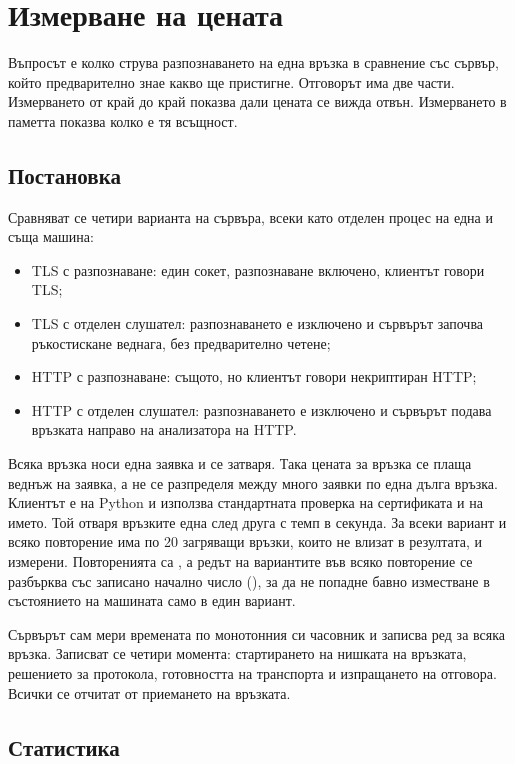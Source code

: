 \section{Измерване на цената}
\label{sec:measurement}

Въпросът е колко струва разпознаването на една връзка в сравнение със сървър, който
предварително знае какво ще пристигне. Отговорът има две части. Измерването от край до
край показва дали цената се вижда отвън. Измерването в паметта показва колко е тя
всъщност.

\subsection{Постановка}

Сравняват се четири варианта на сървъра, всеки като отделен процес на една и съща машина:
\begin{itemize}
\item TLS с разпознаване: един сокет, разпознаване включено, клиентът говори TLS;
\item TLS с отделен слушател: разпознаването е изключено и сървърът започва
  ръкостискане веднага, без предварително четене;
\item HTTP с разпознаване: същото, но клиентът говори некриптиран HTTP;
\item HTTP с отделен слушател: разпознаването е изключено и сървърът подава връзката
  направо на анализатора на HTTP.
\end{itemize}

Всяка връзка носи една заявка и се затваря. Така цената за връзка се плаща веднъж на
заявка, а не се разпределя между много заявки по една дълга връзка. Клиентът е на Python
и използва стандартната проверка на сертификата и на името. Той отваря връзките една
след друга с темп \winRate{} в секунда. За всеки вариант и всяко повторение има по 20
загряващи връзки, които не влизат в резултата, и \winConns{} измерени. Повторенията са
\winReps{}, а редът на вариантите във всяко повторение се разбърква със записано начално
число (\winSeed{}), за да не попадне бавно изместване в състоянието на машината само в
един вариант.

Сървърът сам мери времената по монотонния си часовник и записва ред за всяка връзка.
Записват се четири момента: стартирането на нишката на връзката, решението за протокола,
готовността на транспорта и изпращането на отговора. Всички се отчитат от приемането на
връзката.

\subsection{Статистика}

